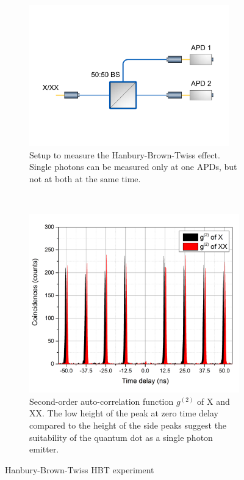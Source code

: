 \begin{figure}[H]
	\centering
	\begin{subfigure}[b]{0.48\textwidth}
		\centering
		\includegraphics[width=0.95\textwidth]{figures/quantum-dot/HBT_Fiber.pdf}
		\caption{Setup to measure the Hanbury-Brown-Twiss effect.
		Single photons can be measured only at one APDs, but not at both at the same time.}
		\label{fig:hbt-fiber}
	\end{subfigure}%
	~ %
	\begin{subfigure}[b]{0.48\textwidth}
		\centering
		\includegraphics[width=\textwidth]{figures/quantum-dot/G2_X_XX.png}
		\caption{Second-order auto-correlation function $g^{(2)}$ of \ac{X} and \ac{XX}.
		The low height of the peak at zero time delay compared to the height of the side peaks suggest the suitability of the quantum dot as a single photon emitter.}
		\label{fig:gs2-x-xx}
	\end{subfigure}
	\caption{Hanbury-Brown-Twiss \acs{HBT} experiment~\cite{schimpf_towards_2017}}
	\label{fig:hbt}
\end{figure}


